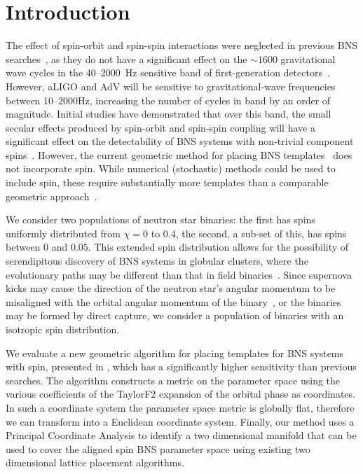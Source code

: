 \section{Introduction}
The effect of spin-orbit and spin-spin interactions were neglected in previous
BNS searches~\cite{Abadie:2011nz}, as they do not have a significant effect on
the $\sim 1600$ gravitational wave cycles in the 40--2000~Hz sensitive band of
first-generation detectors~\cite{Apostolatos:1996rf}. However, aLIGO and AdV
will be sensitive to gravitational-wave frequencies between 10--2000Hz,
increasing the number of cycles in band by an order of magnitude.
Initial studies have demonstrated that over this band, the small secular
effects produced by spin-orbit and spin-spin coupling will have a significant
effect on the detectability of BNS systems with non-trivial component
spins~\cite{Ajith:2011ec}. However, the current geometric method for placing
BNS templates~\cite{Bank06} does not incorporate spin. While numerical
(stochastic) methods could be used to include spin, these require
substantially more templates than a comparable geometric
approach~\cite{Harry:2009ea}. 

We consider two populations of neutron star
binaries: the first has spins uniformly distributed from $\chi = 0$ to $0.4$,
the second, a sub-set of this, has spins between $0$ and $0.05$.  This extended spin
distribution allows for the possibility of serendipitous discovery of BNS
systems in globular clusters, where the evolutionary paths may be different
than that in field binaries~\cite{Grindlay:2005ym}. Since supernova kicks may
cause the direction of the neutron star's angular momentum to be misaligned
with the orbital angular momentum of the binary~\cite{Farr:2011gs}, or the
binaries may be formed by direct capture, we consider  a population of
binaries with an isotropic spin distribution.

We evaluate a new geometric algorithm for placing templates for BNS systems
with spin, presented in \cite{Brown:2012qf},
which has a significantly higher sensitivity than previous
searches. The algorithm constructs a metric on the parameter space using
the various coefficients of the TaylorF2 expansion of the orbital phase as
coordinates. In such a coordinate system the parameter space metric is
globally flat, therefore we can transform into a Euclidean coordinate system.
Finally, our method uses a Principal Coordinate Analysis to identify a two
dimensional manifold that can be used to cover the aligned spin BNS parameter
space using existing two dimensional lattice placement algorithms.

